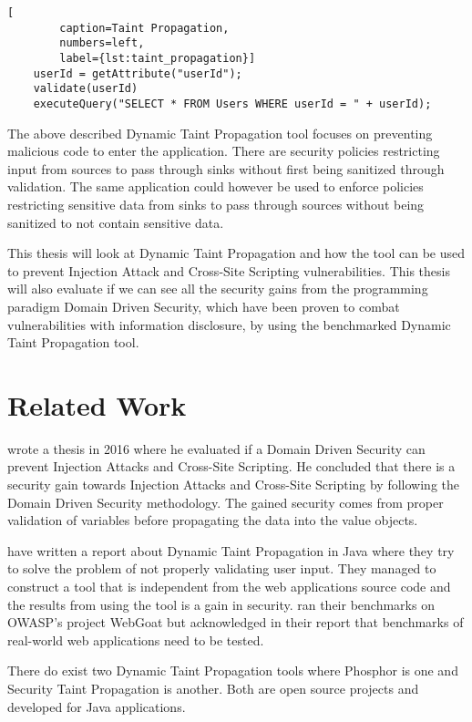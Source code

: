 \documentclass{../kththesis}
\begin{document}
	\hfill
	\begin{lstlisting}[
		caption=Taint Propagation,
		numbers=left,
		label={lst:taint_propagation}]
	userId = getAttribute("userId");
	validate(userId)
	executeQuery("SELECT * FROM Users WHERE userId = " + userId);
	\end{lstlisting}
	\hfill
	
	The above described Dynamic Taint Propagation tool focuses on preventing malicious code to enter the application. There are security policies restricting input from sources to pass through sinks without first being sanitized through validation. The same application could however be used to enforce policies restricting sensitive data from sinks to pass through sources without being sanitized to not contain sensitive data. 
	
	This thesis will look at Dynamic Taint Propagation and how the tool can be used to prevent Injection Attack and Cross-Site Scripting vulnerabilities. This thesis will also evaluate if we can see all the security gains from the programming paradigm Domain Driven Security, which have been proven to combat vulnerabilities with information disclosure, by using the benchmarked Dynamic Taint Propagation tool. 
	
	
	\section{Related Work}
	\textcite{Stendahl2016} wrote a thesis in 2016 where he evaluated if a Domain Driven Security can prevent Injection Attacks and Cross-Site Scripting. He concluded that there is a security gain towards Injection Attacks and Cross-Site Scripting by following the Domain Driven Security methodology. The gained security comes from proper validation of variables before propagating the data into the value objects.
	
	\textcite{Haldar} have written a report about Dynamic Taint Propagation in Java where they try to solve the problem of not properly validating user input. They managed to construct a tool that is independent from the web applications source code and the results from using the tool is a gain in security. \textcite{Haldar} ran their benchmarks on OWASP’s project WebGoat \parencite{webgoat} but acknowledged in their report that benchmarks of real-world web applications need to be tested.
	
	There do exist two Dynamic Taint Propagation tools where Phosphor \parencite{phosphor} is one and Security Taint Propagation \parencite{securityTaint} is another. Both are open source projects and developed for Java applications.
	
\end{document}

